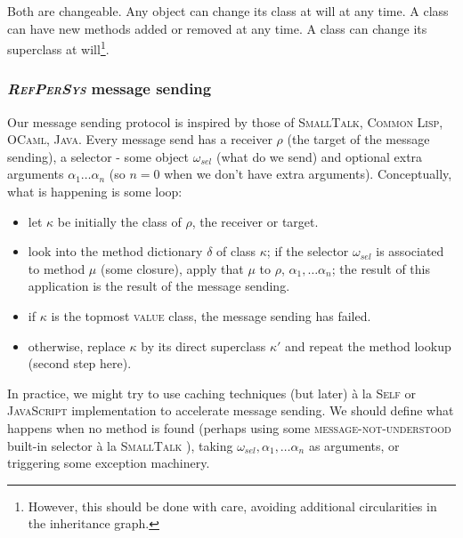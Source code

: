 \documentclass[11pt,a4paper,svgnames]{article}
\newcommand{\RefPerSys}{{\textit{\textsc{RefPerSys}}}}
\begin{document}
Both are changeable. Any object can change its class at will at any
time. A class can have new methods added or removed at any time. A
class can change its superclass at will\footnote{However, this should
be done with care, avoiding additional circularities in the
inheritance graph.}.

\medskip

\subsubsection{{\RefPerSys} message sending}
\label{subsubsec:message}

Our message sending protocol is inspired by those of
\textsc{SmallTalk}, \textsc{Common Lisp}, \textsc{OCaml},
\textsc{Java}. Every message send has a receiver $\rho$ (the target of
the message sending), a selector - some object $\omega_{sel}$ (what do
we send) and optional extra arguments $\alpha_1 \ldots \alpha_n$ (so
$n = 0$ when we don't have extra arguments). Conceptually, what is
happening is some loop:

\begin{itemize}
\item let $\kappa$ be initially the class of $\rho$, the receiver or target.
\item look into the method dictionary $\delta$ of class $\kappa$; if
  the selector $\omega_{sel}$ is associated to method $\mu$ (some
  closure), apply that $\mu$ to $\rho$, $\alpha_1, \ldots \alpha_n$;
  the result of this application is the result of the message sending.
\item if $\kappa$ is the topmost \textsc{value} class, the message
    sending has failed.
  \item otherwise, replace $\kappa$ by its direct superclass $\kappa'$
    and repeat the method lookup (second step here).
\end{itemize}

In practice, we might try to use caching techniques (but later) à la
\textsc{Self} or \textsc{JavaScript} implementation to accelerate
message sending. We should define what happens when no method is found
(perhaps using some \textsc{message-not-understood} built-in selector à
la \textsc{SmallTalk} \cite{kay:1996:early-smalltalk}), taking
$\omega_{sel}, \alpha_1, \ldots \alpha_n$ as arguments, or triggering
some exception machinery.

\bigskip



\end{document}
